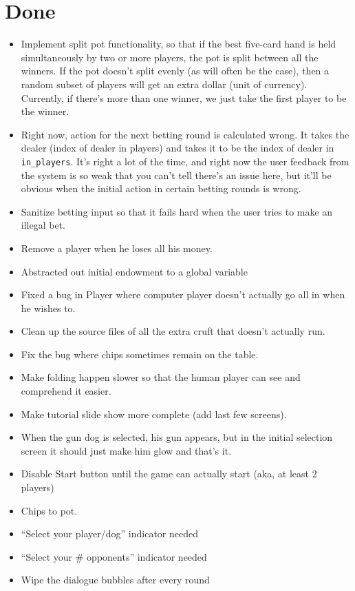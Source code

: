\documentclass[10pt]{article}
\begin{document}
\section*{Done}
\begin{itemize}
\item \CheckedBox Implement split pot functionality, so that if the
  best five-card hand is held simultaneously by two or more players,
  the pot is split between all the winners. If the pot doesn't split
  evenly (as will often be the case), then a random subset of players
  will get an extra dollar (unit of currency). Currently, if there's
  more than one winner, we just take the first player to be the
  winner.
\item \CheckedBox Right now, action for the next betting round is
  calculated wrong. It takes the dealer (index of dealer in players)
  and takes it to be the index of dealer in \verb^in_players^. It's
  right a lot of the time, and right now the user feedback from the
  system is so weak that you can't tell there's an issue here, but
  it'll be obvious when the initial action in certain betting rounds
  is wrong.
\item \CheckedBox Sanitize betting input so that it fails hard when
  the user tries to make an illegal bet.
\item \CheckedBox Remove a player when he loses all his money.
\item \CheckedBox Abstracted out initial endowment to a global
  variable
\item \CheckedBox Fixed a bug in Player where computer player doesn't
  actually go all in when he wishes to.
\item \CheckedBox Clean up the source files of all the extra cruft
  that doesn't actually run.
\item \CheckedBox Fix the bug where chips sometimes remain on the table.
\item \CheckedBox Make folding happen slower so that the human player
  can see and comprehend it easier.
\item \CheckedBox Make tutorial slide show more complete (add last few screens).
\item \CheckedBox When the gun dog is selected, his gun appears, but in the
  initial selection screen it should just make him glow and that's it.
\item \CheckedBox Disable Start button until the game can actually start (aka, at
  least 2 players)
\item \CheckedBox Chips to pot.
\item \CheckedBox ``Select your player/dog'' indicator needed
\item \CheckedBox ``Select your \# opponents'' indicator needed
\item \CheckedBox Wipe the dialogue bubbles after every round
\end{itemize}
\end{document}
